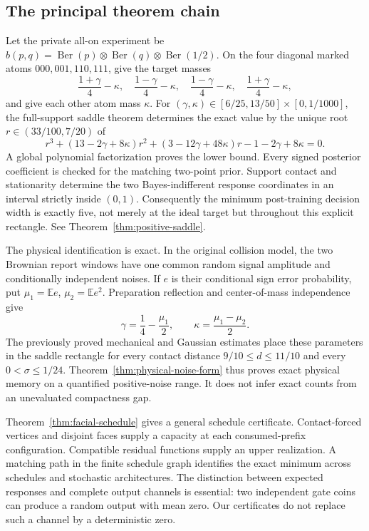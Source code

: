 \documentclass[11pt]{amsart}
\theoremstyle{definition}\newtheorem{definition}[theorem]{Definition}
\theoremstyle{remark}\newtheorem{remark}[theorem]{Remark}
\newcommand{\Ber}{\operatorname{Ber}}
\newcommand{\1}{\mathbf 1}
\begin{document}
\subsection{The principal theorem chain}
Let the private all-on experiment be
$b(p,q)=\Ber(p)\otimes\Ber(q)\otimes\Ber(1/2)$. On the four diagonal
marked atoms $000,001,110,111$, give the target masses
\[
 \frac{1+\gamma}{4}-\kappa,\quad
 \frac{1-\gamma}{4}-\kappa,\quad
 \frac{1-\gamma}{4}-\kappa,\quad
 \frac{1+\gamma}{4}-\kappa,
\]
and give each other atom mass $\kappa$. For
$(\gamma,\kappa)\in[6/25,13/50]\times[0,1/1000]$, the full-support
saddle theorem determines the exact value by the unique root
$r\in(33/100,7/20)$ of
\[
 r^3+(13-2\gamma+8\kappa)r^2
       +(3-12\gamma+48\kappa)r-1-2\gamma+8\kappa=0.
\]
A global polynomial factorization proves the lower bound. Every signed
posterior coefficient is checked for the matching two-point prior.
Support contact and stationarity determine the two Bayes-indifferent
response coordinates in an interval strictly inside $(0,1)$.
Consequently the minimum post-training decision width is exactly five,
not merely at the ideal target but throughout this explicit rectangle.
See Theorem~\ref{thm:positive-saddle}.

The physical identification is exact. In the original collision model,
the two Brownian report windows have one common random signal amplitude
and conditionally independent noises. If $e$ is their conditional sign
error probability, put $\mu_1=\mathbb E e$, $\mu_2=\mathbb E e^2$.
Preparation reflection and center-of-mass independence give
\[
 \gamma=\frac14-\frac{\mu_1}{2},\qquad
 \kappa=\frac{\mu_1-\mu_2}{2}.
\]
The previously proved mechanical and Gaussian estimates place these
parameters in the saddle rectangle for every contact distance
$9/10\le d\le11/10$ and every $0<\sigma\le1/24$.
Theorem~\ref{thm:physical-noise-form} thus proves exact physical memory
on a quantified positive-noise range. It does not infer exact counts
from an unevaluated compactness gap.

Theorem~\ref{thm:facial-schedule} gives a general schedule certificate.
Contact-forced vertices and disjoint faces supply a capacity at each
consumed-prefix configuration. Compatible residual functions supply an
upper realization. A matching path in the finite schedule graph
identifies the exact minimum across schedules and stochastic
architectures. The distinction between expected responses and complete
output channels is essential: two independent gate coins can produce
a random output with mean zero. Our certificates do not replace such
a channel by a deterministic zero.
\end{document}
